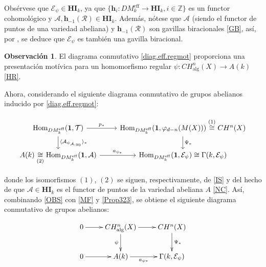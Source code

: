 \documentclass[10pt]{amsart}
\theoremstyle{definition}
\newtheorem{obs}[definition]{Observaci\'on}
\theoremstyle{remark}
\theoremstyle{definition}
\begin{document}
Obsérvese que $\mathcal{E}_{\psi}\in\mathbf{HI}_{k}$, ya que $\{\mathbf{h}_{i}:DM_{k}^{\mathrm{eff}}\to\mathbf{HI}_{k},i\in\mathbb{Z}\}$ es un functor cohomológico \cite[Thm. 1.3.6]{BBD82} y $\mathcal{A},\mathbf{h}_{-1}(\mathcal{R})\in\mathbf{HI}_{k}$. Además, nótese que $\mathcal{A}$ (siendo el functor de puntos de una variedad abeliana) y $\mathbf{h}_{-1}(\mathcal{R})$ son gavillas biracionales \ref{GB}, así, por \cite[Prop. 2.6.2]{KS17}, se deduce que $\mathcal{E}_{\psi}$ es también una gavilla biracional.

\begin{obs}
El diagrama conmutativo \ref{diag.eff.regmot} proporciona una presentación motívica para un homomorfismo regular $\psi:CH_{\mathrm{alg}}^{n}(X)\to A(k)$ \ref{HR}.
\end{obs}

Ahora, considerando el siguiente diagrama conmutativo de grupos abelianos inducido por \ref{diag.eff.regmot}:


\begingroup{} \label{D3}
\begin{equation}
\begin{tikzcd}
\operatorname{Hom}_{DM_{k}^{\mathrm{eff}}}(\mathbf{1}, \mathcal{T})\arrow[r, "p_{*}"]\arrow[d, "\langle\mathcal{A}_{\psi_{\mathcal{A},y_{0}}}\rangle_{*}"] & \operatorname{Hom}_{DM_{k}^{\mathrm{eff}}}(\mathbf{1},\varphi_{d-n}(M(X))) \arrow[d, "\Psi_{*}"]  \stackrel{(1)}{\cong}CH^{n}(X) \\
A(k) \underset{\text{(2)}}{\cong}\operatorname{Hom}_{DM_{k}^{\mathrm{eff}}}(\mathbf{1},\mathcal{A}) \arrow[r, "a_{\psi_{*}}"] & \operatorname{Hom}_{DM_{k}^{\mathrm{eff}}}(\mathbf{1}, \mathcal{E}_{\psi})\cong\Gamma(k,\mathcal{E}_{\psi})
\end{tikzcd}
\end{equation}
\endgroup


donde los isomorfismos $(1)$, $(2)$ se siguen, respectivamente, de \ref{IS} y del hecho de que $\mathcal{A}\in\mathbf{HI}_{k}$ es el functor de puntos de la variedad abeliana $A$ \ref{NC}. Así, combinando \ref{OBS} con \ref{MF} y \ref{Prop323}, se obtiene el siguiente diagrama conmutativo de grupos abelianos:

\begin{align}  \label{diag.ind.reghom}
\begin{split}
\xymatrix{0 \ar[r]& CH^n_{\mathrm{alg}}(X) \ar[r] \ar[d]_-\psi& CH^n (X) 
\ar[d]^-{\Psi _\ast} \\
0 \ar[r]& A(k) \ar[r]_-{a_{\psi \ast}} & \Gamma (k, \mathcal E _{\psi})}
\end{split}
\end{align}
\end{document}

